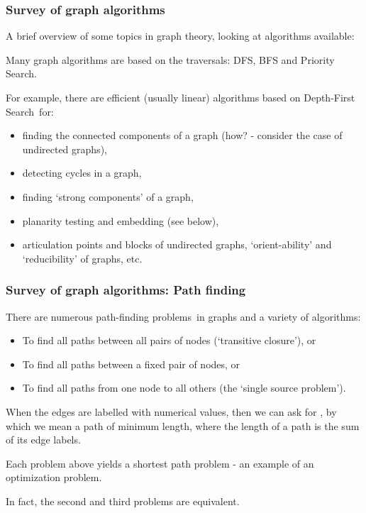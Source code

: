   \begin{frame}[fragile]\frametitle{Survey of graph algorithms}

\color{red}A brief overview of some topics in graph theory, looking at algorithms available\color{black}:

Many graph algorithms are based on the traversals:  \color{blue}DFS, BFS and Priority Search\color{black}. 

For example, there are efficient (usually linear) algorithms based on \color{blue}Depth-First Search\color{black}\ for:

\begin{itemize}
\item finding the connected components of a graph (how? - consider the case of undirected graphs),
\item detecting cycles in a graph,
\item finding `strong components' of a graph, 
\item planarity testing and embedding (see below), 
\item articulation points and blocks of undirected graphs, 
`orient-ability' and `reducibility' of graphs, etc.
\end{itemize}

\end{frame}

   \begin{frame}[fragile]\frametitle{Survey of graph algorithms: Path finding}

There are numerous \color{blue}path-finding problems\color{black}\ in graphs and a variety of algorithms:

\begin{itemize}
\item To find all paths between all pairs of nodes (`transitive closure'), or
\item To find all paths between a fixed pair of nodes, or
\item To find all paths from one node to all others (the `single source problem').
\end{itemize}

When the edges are labelled with numerical values, then we can ask for \color{blue}{shortest paths}\color{black},
by which we mean a path of minimum length, where the length of a path is the sum of 
its edge labels. 

Each problem above yields a shortest path problem - an example of an \color{blue}optimization problem\color{black}.

In fact, the second and third problems are equivalent.

\end{frame}

